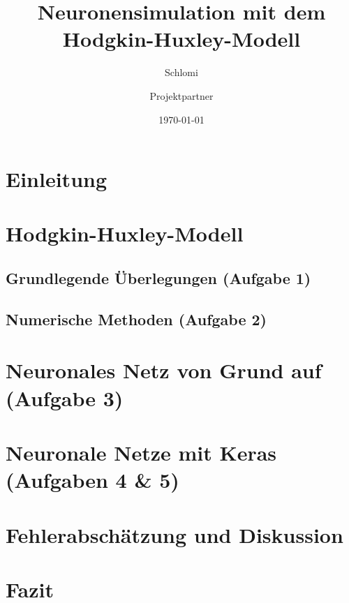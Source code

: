 \documentclass[11pt,a4paper]{article}
\title{Neuronensimulation mit dem Hodgkin-Huxley-Modell}
\author{Schlomi \and Projektpartner}
\date{\today}
\begin{document}
\maketitle


\section{Einleitung}

\section{Hodgkin-Huxley-Modell}

\subsection{Grundlegende Überlegungen (Aufgabe 1)}

\subsection{Numerische Methoden (Aufgabe 2)}

\section{Neuronales Netz von Grund auf (Aufgabe 3)}

\section{Neuronale Netze mit Keras (Aufgaben 4 \& 5)}

\section{Fehlerabschätzung und Diskussion}

\section{Fazit}
\end{document}
